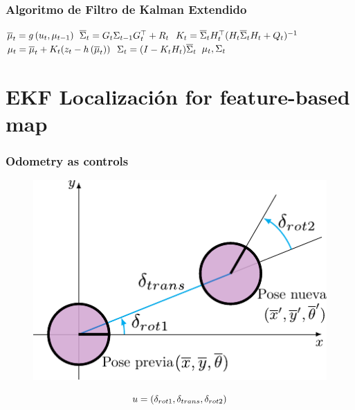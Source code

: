 \begin{frame}
	\frametitle{Algoritmo de Filtro de Kalman Extendido}
	
    \begin{algorithmic}[1]
        \State $\overline{\mu}_{t} = g\left( u_{t}, \mu_{t-1} \right)$
        \State $\overline{\Sigma}_{t} = G_{t} \Sigma_{t-1} G_{t}^{\top}+R_{t}$
        \Statex
        \State $K_{t} = \overline{\Sigma}_{t} H_{t}^{\top} (H_{t} \overline{\Sigma}_{t}  H_{t} + Q_{t})^{-1} $
        \State $\mu_{t} = \overline{\mu}_{t} + K_{t} (z_{t} - h\left( \overline{\mu}_{t} \right))$
        \State $\Sigma_{t} =  (I - K_{t} H_{t}) \overline{\Sigma}_{t}$
        \State \Return $\mu_{t}, \Sigma_{t}$
    \EndProcedure
    \end{algorithmic}
\end{frame}

\section{EKF Localización for feature-based map}

\begin{frame}
	\frametitle{Odometry as controls}
	
   	\begin{figure}[!h]
        \includegraphics[width=0.6\columnwidth]{./images/odometry_as_controls.pdf}
    \end{figure}

    \begin{equation*}
        u = (\delta_{rot1}, \delta_{trans}, \delta_{rot2})
    \end{equation*}
	
\end{frame}


